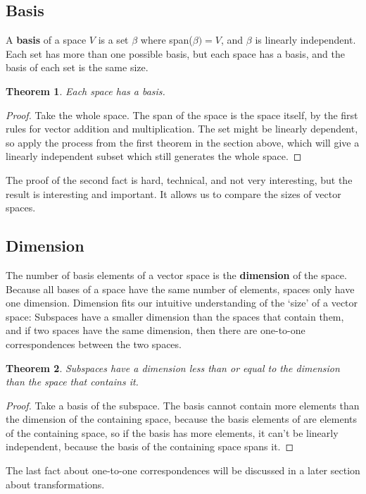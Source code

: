 \documentclass{article}
\newtheorem*{theorem}{Theorem}
\begin{document}
       \subsection{Basis}
           A \textbf{basis} of a space $V$ is a set $\beta$ where span($\beta) = V$, and $\beta$ is linearly independent. Each set has more than one possible basis, but each space has a basis, and the basis of each set is the same size. 
           \begin{theorem}
               Each space has a basis.
           \end{theorem}
           \begin{proof}
               Take the whole space. The span of the space is the space itself, by the first rules for vector addition and multiplication. The set might be linearly dependent, so apply the process from the first theorem in the section above, which will give a linearly independent subset which still generates the whole space.
           \end{proof}
           The proof of the second fact is hard, technical, and not very interesting, but the result is interesting and important. It allows us to compare the sizes of vector spaces.
       \subsection{Dimension}
            The number of basis elements of a vector space is the \textbf{dimension} of the space. Because all bases of a space have the same number of elements, spaces only have one dimension. Dimension fits our intuitive understanding of the `size' of a vector space: Subspaces have a smaller dimension than the spaces that contain them, and if two spaces have the same dimension, then there are one-to-one correspondences between the two spaces. 
            \begin{theorem}
                Subspaces have a dimension less than or equal to the dimension than the space that contains it.
            \end{theorem}
            \begin{proof}
                Take a basis of the subspace. The basis cannot contain more elements than the dimension of the containing space, because the basis elements of are elements of the containing space, so if the basis has more elements, it can't be linearly independent, because the basis of the containing space spans it.
            \end{proof}
            The last fact about one-to-one correspondences will be discussed in a later section about transformations.
\end{document}
